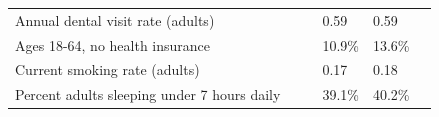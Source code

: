 \documentclass[9pt]{report}
\begin{document}
\begin{tabular}{p{.10in}p{.10in}p{.10in}p{3.7in}>{\hfill}p{.85in}>{\hfill}p{.85in}>{\hfill}p{.85in}>{\hfill}p{.85in}p{0.1in}}
\multicolumn{4}{l}{\parbox{3.6in}{\strut\raggedright{{Annual dental visit rate (adults)}}\strut}} &  &  & 0.59 & 0.59 & \multicolumn{1}{l}{}  \\ 
\multicolumn{4}{l}{\parbox{3.6in}{\strut\raggedright{{Ages 18-64, no health insurance}}\strut}} &  &  & 10.9\% & 13.6\% & \multicolumn{1}{l}{}  \\ 
\multicolumn{4}{l}{\parbox{3.6in}{\strut\raggedright{{Current smoking rate (adults)}}\strut}} &  &  & 0.17 & 0.18 & \multicolumn{1}{l}{}  \\ 
\multicolumn{4}{l}{\parbox{3.6in}{\strut\raggedright{{Percent adults sleeping under 7 hours daily}}\strut}} &  &  & 39.1\% & 40.2\% & \multicolumn{1}{l}{}  \\ 

\end{tabular}
\setlength{\tabcolsep}{6pt} %


\vspace{36pt}
\linespread{1.5}
\theendnotes
\end{document}

